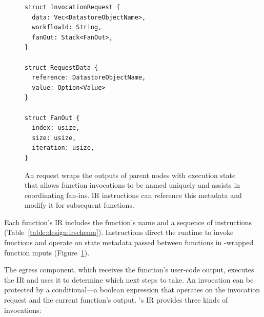 \begin{figure}[t]
    \centering
    \begin{verbatim}
struct InvocationRequest {
  data: Vec<DatastoreObjectName>,
  workflowId: String,
  fanOut: Stack<FanOut>,
}

struct RequestData {
  reference: DatastoreObjectName,
  value: Option<Value>
}

struct FanOut {
  index: usize,
  size: usize,
  iteration: usize,
}
    \end{verbatim}
    \caption{An \name{} request wraps the outputs of parent nodes with execution
state that allows function invocations to be named uniquely and assists in
coordinating fan-ins. \name{} IR instructions can reference this metadata and
modify it for subsequent functions.}
    \label{fig:design:unum-request}
\end{figure}



Each function's IR includes the function's name and a sequence of instructions
(Table~\ref{table:design:irschema}). Instructions direct the runtime to invoke
functions and operate on state metadata passed between functions in
\name{}-wrapped function inputs (Figure~\ref{fig:design:unum-request}).

The egress component, which receives the function's user-code output, executes
the IR and uses it to determine which next steps to take. An invocation can be
protected by a conditional---a boolean expression that operates on the
invocation request and the current function's output. \name{}'s IR provides
three kinds of invocations:

